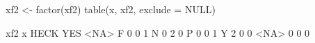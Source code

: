 \begin{Schunk}
\begin{Sinput}
  xf2 <- factor(xf2)
  table(x, xf2, exclude = NULL)
\end{Sinput}
\begin{Soutput}
      xf2
x      HECK YES <NA>
  F       0   0    1
  N       0   2    0
  P       0   0    1
  Y       2   0    0
  <NA>    0   0    0
\end{Soutput}
\end{Schunk}
